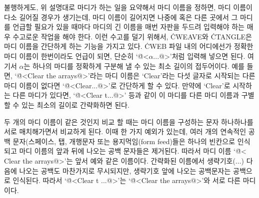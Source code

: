 불행하게도, 위 설명대로 마디가 하는 일을 요약해서 마디 이름을 정하면, 마디 이름이 다소 길어질
경우가 생기는데, 마디 이름이 길어지면 나중에 혹은 다른 곳에서 그 마디를 언급할 필요가 있을
때마다 마디의 긴 이름을 매번 자판을 두드려 입력해야 하는 매우 수고로운 작업을 해야 한다.
이런 수고를 덜기 위해서, \.{CWEAVE}와 \.{CTANGLE}은 마디 이름을 간단하게 하는 기능을
가지고 있다. \.{CWEB} 파일 내의 어디에선가 정확한 마디 이름이 한번이라도 언급이 되면, 단순히
`\.{@<$\alpha$...@>}'처럼 입력해 넣으면 된다. 여기서 $\alpha$는 하나의 마디를 정확하게
구분해 낼 수 있는 최소 길이의 접두어이다. 예를 들면, `\.{@<Clear the arrays@>}'라는 마디
이름은 `Clear'라는 다섯 글자로 시작되는 다른 마디 이름이 없다면 `\.{@<Clear...@>}'로
간단하게 할 수 있다. 만약에 `Clear'로 시작하는 다른 마디가 있다면, `\.{@<Clear t...@>}'
등과 같이 이 마디를 다른 마디 이름과 구별할 수 있는 최소의 길이로 간략화하면 된다.

두 개의 마디 이름이 같은 것인지 비교 할 때는 마디 이름을 구성하는 문자 하나하나를 서로
매치해가면서 비교하게 된다. 이때 한 가지 예외가 있는데, 여러 개의 연속적인 공백 문자(스페이스,
탭, 개행문자 또는 용지먹임(form feed)들은 하나의 빈칸으로 인식되고 마디 이름의 앞과 뒤에
나오는 공백 문자들은 제거된다. 따라서 마디 이름 `\.{@< Clear the arrays@>}'는 앞서 예와
같은 이름이다. 간략화된 이름에서 생략기호($\ldots$) 다음에 나오는 공백도 마찬가지로
무시되지만, 생략기호 앞에 나오는 공백문자는 공백으로 인식된다. 따라서
`\.{@<Clear t ...@>}'는 `\.{@<Clear the arrays@>}'와 서로 다른 마디이다.

